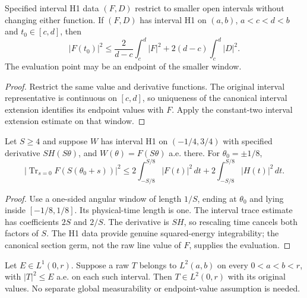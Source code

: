 \begin{lemma}
\label{lem:interval-window-trace}
\leanok
Specified interval H1 data $(F,D)$ restrict to smaller open intervals without
changing either function.
If $(F,D)$ has interval H1 on $(a,b)$, $a<c<d<b$ and $t_0\in[c,d]$, then
\[
 |F(t_0)|^2\le \frac{2}{d-c}\int_c^d|F|^2
                   +2(d-c)\int_c^d|D|^2 .
\]
The evaluation point may be an endpoint of the smaller window.
\end{lemma}

\begin{proof}
\leanok
Restrict the same value and derivative functions.
The original interval representative is continuous on $[c,d]$, so uniqueness
of the canonical interval extension identifies its endpoint values with $F$.
Apply the constant-two interval extension estimate on that window.
\end{proof}

\begin{lemma}
\label{lem:clock-endpoint-trace}
\leanok
Let $S\ge4$ and suppose $W$ has interval H1 on $(-1/4,3/4)$ with specified
derivative $S H(S\theta)$, and $W(\theta)=F(S\theta)$ a.e. there.
For $\theta_0=\pm1/8$,
\[
 \left|\operatorname{Tr}_{s=0} F(S(\theta_0+s))\right|^2
 \le 2\int_{-S/8}^{S/8}|F(t)|^2\,dt+
      2\int_{-S/8}^{S/8}|H(t)|^2\,dt .
\]
\end{lemma}

\begin{proof}
\leanok
Use a one-sided angular window of length $1/S$, ending at $\theta_0$ and
lying inside $[-1/8,1/8]$. Its physical-time length is one.
The interval trace estimate has coefficients $2S$ and $2/S$.
The derivative is $SH$, so rescaling time cancels both factors of $S$.
The H1 data provide genuine squared-energy integrability; the canonical
section germ, not the raw line value of $F$, supplies the evaluation.
\end{proof}

\begin{lemma}
\label{lem:local-l2-square-majorant}
\leanok
Let $E\in L^1(0,r)$. Suppose a raw $T$ belongs to $L^2(a,b)$ on every
$0<a<b<r$, with $|T|^2\le E$ a.e. on each such interval.
Then $T\in L^2(0,r)$ with its original values.
No separate global measurability or endpoint-value assumption is needed.
\end{lemma}

